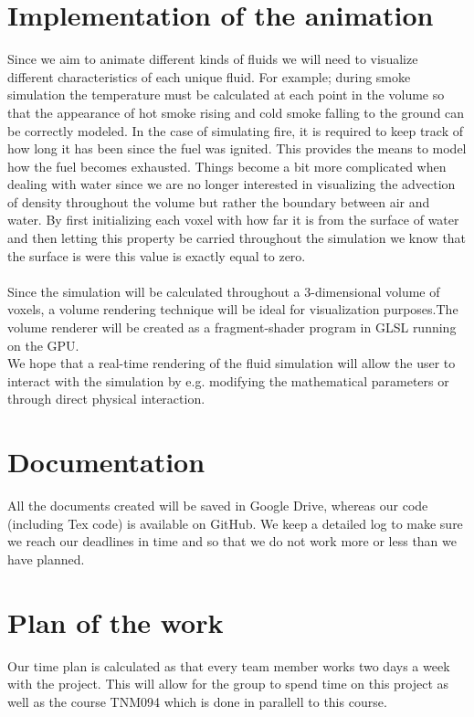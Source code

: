 \documentclass[a4paper,12pt,twoside,swedish]{report}
\begin{document}
\section{Implementation of the animation}
Since we aim to animate different kinds of fluids we will need to visualize different characteristics of each unique fluid.
For example; during smoke simulation the temperature must be calculated at each point in the volume so that the appearance of hot smoke rising and cold smoke falling to the ground can be correctly modeled. In the case of simulating fire, it is required to keep track of how long it has been since the fuel was ignited. This provides the means to model how the fuel becomes exhausted.
Things become a bit more complicated when dealing with water since we are no longer interested in visualizing the advection of density throughout the volume but rather the boundary between air and water. By first initializing each voxel with how far it is from the surface of water and then letting this property be carried throughout the simulation we know that the surface is were this value is exactly equal to zero.\\\\
Since the simulation will be calculated throughout a 3-dimensional volume of voxels, a volume rendering technique will be ideal for visualization purposes.The volume renderer will be created as a fragment-shader program   in GLSL running on the GPU.\\
We hope that a real-time rendering of the fluid simulation will allow the user to interact with the simulation by e.g. modifying the mathematical parameters or through direct physical interaction.

\section{Documentation}
All the documents created will be saved in Google Drive, whereas our code (including Tex code) is available on GitHub.
We keep a detailed log to make sure we reach our deadlines in time and so that we do not work more or less than we have planned.

\section{Plan of the work}
Our time plan is calculated as that every team member works two days a week with the project. This will allow for the group to spend time on this project as well as the course TNM094 which is done in parallell to this course.
\end{document}
